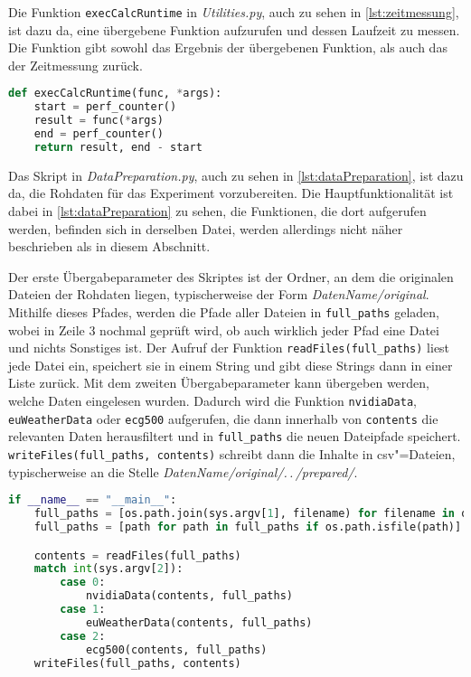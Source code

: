 Die Funktion \lstinline|execCalcRuntime| in \textit{Utilities.py}, auch zu sehen in \autoref{lst:zeitmessung}, ist dazu da, eine übergebene Funktion aufzurufen und dessen Laufzeit zu messen. Die Funktion gibt sowohl das Ergebnis der übergebenen Funktion, als auch das der Zeitmessung zurück.
\begin{lstlisting}[caption=Funktion zur Zeitmessung, language=Python, label=lst:zeitmessung, style=Python]
def execCalcRuntime(func, *args):
    start = perf_counter()
    result = func(*args)
    end = perf_counter()
    return result, end - start
\end{lstlisting}

Das Skript in \textit{DataPreparation.py}, auch zu sehen in \autoref{lst:dataPreparation}, ist dazu da, die Rohdaten für das Experiment vorzubereiten. Die Hauptfunktionalität ist dabei in \autoref{lst:dataPreparation} zu sehen, die Funktionen, die dort aufgerufen werden, befinden sich in derselben Datei, werden allerdings nicht näher beschrieben als in diesem Abschnitt.

Der erste Übergabeparameter des Skriptes ist der Ordner, an dem die originalen Dateien der Rohdaten liegen, typischerweise der Form \textit{DatenName/original}. Mithilfe dieses Pfades, werden die Pfade aller Dateien in \lstinline|full_paths| geladen, wobei in Zeile 3 nochmal geprüft wird, ob auch wirklich jeder Pfad eine Datei und nichts Sonstiges ist. Der Aufruf der Funktion \lstinline|readFiles(full_paths)| liest jede Datei ein, speichert sie in einem String und gibt diese Strings dann in einer Liste zurück. Mit dem zweiten Übergabeparameter kann übergeben werden, welche Daten eingelesen wurden. Dadurch wird die Funktion \lstinline|nvidiaData|, \lstinline|euWeatherData| oder \lstinline|ecg500| aufgerufen, die dann innerhalb von \lstinline|contents| die relevanten Daten herausfiltert und in \lstinline|full_paths| die neuen Dateipfade speichert. \lstinline|writeFiles(full_paths, contents)| schreibt dann die Inhalte in csv"=Dateien, typischerweise an die Stelle \textit{DatenName/original/.\,.\,/prepared/}.
\begin{lstlisting}[caption=Funktion zur Zeitmessung, language=Python, label=lst:dataPreparation, style=Python]
if __name__ == "__main__":
    full_paths = [os.path.join(sys.argv[1], filename) for filename in os.listdir(sys.argv[1])]
    full_paths = [path for path in full_paths if os.path.isfile(path)]

    contents = readFiles(full_paths)
    match int(sys.argv[2]):
        case 0:
            nvidiaData(contents, full_paths)
        case 1:
            euWeatherData(contents, full_paths)
        case 2:
            ecg500(contents, full_paths)
    writeFiles(full_paths, contents)
\end{lstlisting}